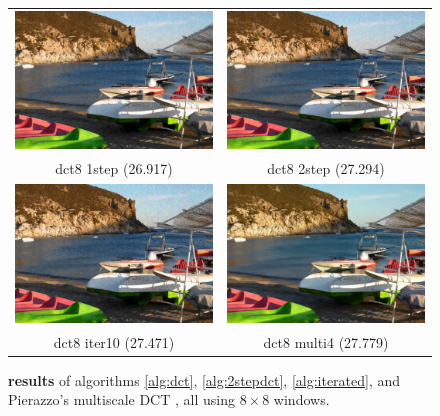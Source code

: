 \documentclass{ipol}
\begin{document}
\begin{figure}[htbp]
\begin{center}
\begin{tabular}{cc}

\includegraphics[width = .44\textwidth]{f/dct8_1step} &
\includegraphics[width = .44\textwidth]{f/dct8_2step} \\
dct8 1step (26.917) & dct8 2step (27.294) \\
\includegraphics[width = .44\textwidth]{f/dct8_iter10} &
\includegraphics[width = .44\textwidth]{f/dct8_multi4} \\
dct8 iter10 (27.471) &  dct8 multi4 (27.779)\\


\end{tabular}
\caption{{\bf results} of algorithms \ref{alg:dct}, \ref{alg:2stepdct},  \ref{alg:iterated}, and Pierazzo's multiscale DCT \cite{multiscaler2016},  all using  $8 \times 8$ windows.}
\label{fig:res8}
\end{center}
\end{figure}
\end{document}
